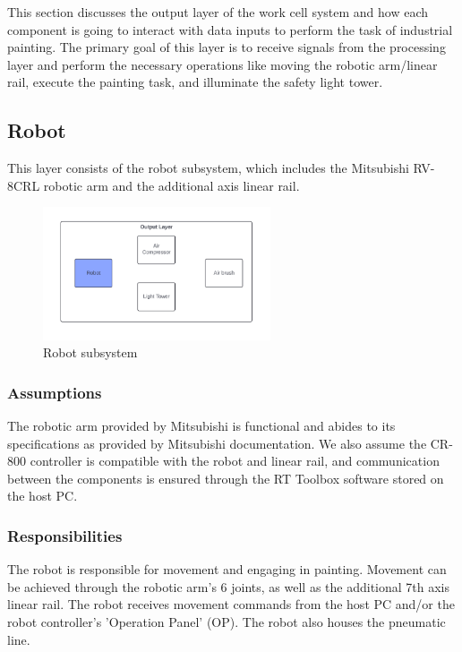 This section discusses the output layer of the work cell system and how each component is going to interact with  data inputs to perform the task of industrial painting. The primary goal of this layer is to receive signals from the processing layer and perform the necessary operations like moving the robotic arm/linear rail, execute the painting task, and illuminate the safety light tower.


\subsection{Robot}
This layer consists of the robot subsystem, which includes the Mitsubishi RV-8CRL robotic arm and the additional axis linear rail.

\begin{figure}[h!]
	\centering
 	\includegraphics[width=0.60\textwidth]{images/Output_robot.png}
 \caption{Robot subsystem}
\end{figure}

\subsubsection{Assumptions}
The robotic arm provided by Mitsubishi is functional and abides to its specifications as provided by Mitsubishi documentation. We also assume the CR-800 controller is compatible with the robot and linear rail, and communication between the components is ensured through the RT Toolbox software stored on the host PC.

\subsubsection{Responsibilities}
The robot is responsible for movement and engaging in painting. Movement can be achieved through the robotic arm's 6 joints, as well as the additional 7th axis linear rail. The robot receives movement commands from the host PC and/or the robot controller's 'Operation Panel' (OP). The robot also houses the pneumatic line.
